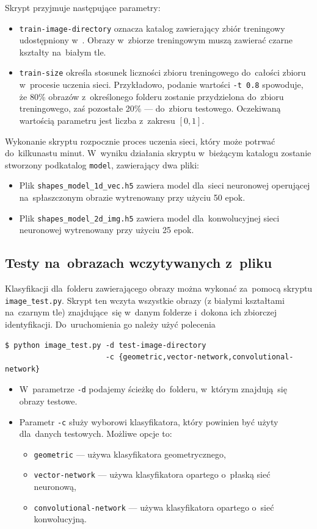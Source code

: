 \documentclass[11pt,a4paper]{article}
\begin{document}
Skrypt przyjmuje następujące parametry:
\begin{itemize}
    \item \verb+train-image-directory+ oznacza katalog zawierający zbiór treningowy udostępniony w~\cite{shapes}.
    Obrazy w~zbiorze treningowym muszą zawierać czarne kształty na~białym tle.
    \item \verb+train-size+ określa stosunek liczności zbioru treningowego do~całości zbioru w~procesie uczenia sieci.
    Przykładowo, podanie wartości \verb+-t 0.8+ spowoduje, że 80\% obrazów z~określonego folderu zostanie przydzielona do~zbioru treningowego, zaś pozostałe 20\% --- do~zbioru testowego.
    Oczekiwaną wartością parametru jest liczba z~zakresu $[0, 1]$.
\end{itemize}

Wykonanie skryptu rozpocznie proces uczenia sieci, który może potrwać do~kilkunastu minut.
W~wyniku działania skryptu w~bieżącym katalogu zostanie stworzony podkatalog \verb+model+, zawierający dwa pliki:

\begin{itemize}
    \item Plik \verb+shapes_model_1d_vec.h5+ zawiera model dla~sieci neuronowej operującej na~spłaszczonym obrazie wytrenowany przy użyciu 50 epok.
    \item Plik \verb+shapes_model_2d_img.h5+ zawiera model dla~konwolucyjnej sieci neuronowej wytrenowany przy użyciu 25 epok.
\end{itemize}

\subsection{Testy na~obrazach wczytywanych z~pliku}

Klasyfikacji dla~folderu zawierającego obrazy można wykonać za~pomocą skryptu \verb+image_test.py+.
Skrypt ten wczyta wszystkie obrazy (z białymi kształtami na~czarnym tle) znajdujące~się w~danym folderze i~dokona ich zbiorczej identyfikacji.
Do~uruchomienia go należy użyć polecenia
\begin{verbatim}
$ python image_test.py -d test-image-directory
                       -c {geometric,vector-network,convolutional-network}
\end{verbatim}

\begin{itemize}
    \item W~parametrze \verb+-d+ podajemy ścieżkę do~folderu, w~którym znajdują~się obrazy testowe.
    \item Parametr \verb+-c+ służy wyborowi klasyfikatora, który powinien być użyty dla~danych testowych.
    Możliwe opcje to:
    \begin{itemize}
        \item \verb+geometric+ --- używa klasyfikatora geometrycznego,
        \item \verb+vector-network+ --- używa klasyfikatora opartego o~płaską sieć neuronową,
        \item \verb+convolutional-network+ --- używa klasyfikatora opartego o~sieć konwolucyjną.
    \end{itemize}
\end{itemize}
\end{document}
